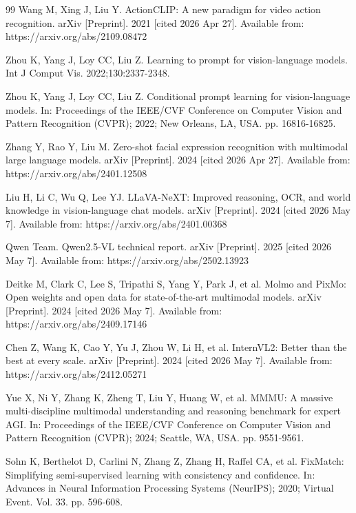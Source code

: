 \documentclass{ieeeaccess}
\begin{document}
\begin{thebibliography}{99}
Wang M, Xing J, Liu Y.
ActionCLIP: A new paradigm for video action recognition.
arXiv [Preprint]. 2021 [cited 2026 Apr 27]. Available from:
https://arxiv.org/abs/2109.08472

Zhou K, Yang J, Loy CC, Liu Z.
Learning to prompt for vision-language models.
Int J Comput Vis. 2022;130:2337-2348.

Zhou K, Yang J, Loy CC, Liu Z.
Conditional prompt learning for vision-language models.
In: Proceedings of the IEEE/CVF Conference on Computer Vision and
Pattern Recognition (CVPR); 2022; New Orleans, LA, USA.
pp. 16816-16825.

Zhang Y, Rao Y, Liu M.
Zero-shot facial expression recognition with multimodal large language
models. arXiv [Preprint]. 2024 [cited 2026 Apr 27]. Available from:
https://arxiv.org/abs/2401.12508

Liu H, Li C, Wu Q, Lee YJ.
LLaVA-NeXT: Improved reasoning, OCR, and world knowledge in
vision-language chat models. arXiv [Preprint]. 2024 [cited 2026 May 7].
Available from: https://arxiv.org/abs/2401.00368

Qwen Team.
Qwen2.5-VL technical report. arXiv [Preprint]. 2025 [cited 2026 May 7].
Available from: https://arxiv.org/abs/2502.13923

Deitke M, Clark C, Lee S, Tripathi S, Yang Y, Park J, et al.
Molmo and PixMo: Open weights and open data for state-of-the-art
multimodal models. arXiv [Preprint]. 2024 [cited 2026 May 7]. Available
from: https://arxiv.org/abs/2409.17146

Chen Z, Wang K, Cao Y, Yu J, Zhou W, Li H, et al.
InternVL2: Better than the best at every scale.
arXiv [Preprint]. 2024 [cited 2026 May 7]. Available from:
https://arxiv.org/abs/2412.05271

Yue X, Ni Y, Zhang K, Zheng T, Liu Y, Huang W, et al.
MMMU: A massive multi-discipline multimodal understanding and
reasoning benchmark for expert AGI. In: Proceedings of the IEEE/CVF
Conference on Computer Vision and Pattern Recognition (CVPR); 2024;
Seattle, WA, USA. pp. 9551-9561.

Sohn K, Berthelot D, Carlini N, Zhang Z, Zhang H, Raffel CA, et al.
FixMatch: Simplifying semi-supervised learning with consistency
and confidence.
In: Advances in Neural Information Processing Systems (NeurIPS);
2020; Virtual Event. Vol. 33. pp. 596-608.


\end{thebibliography}
\end{document}
